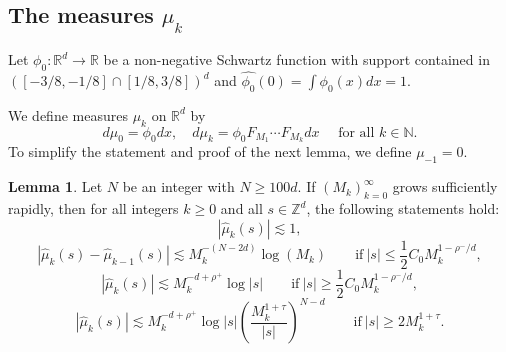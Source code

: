\documentclass{amsart}
\numberwithin{equation}{section}
\theoremstyle{definition}
\newtheorem{lemma}[theorem]{Lemma}
\theoremstyle{definition}
\def\RR{\mathbb{R}}
\def\ZZ{\mathbb{Z}}
\def\NN{\mathbb{N}}
\begin{document}
\subsection{The measures \texorpdfstring{$\mu_k$}{muk}}


Let $\phi_0:\RR^d \to \RR$ be a non-negative Schwartz function with support contained in  $([-3/8,-1/8] \cap [1/8,3/8])^d$ and $\widehat{\phi_0}(0) = \int \phi_0(x) dx = 1$. 
%


We define measures $\mu_k$ on $\RR^d$ by
$$
d\mu_0 = \phi_0 dx, \quad d\mu_k = \phi_0  F_{M_1} \cdots F_{M_{k}} dx \quad \text{ for all } k \in \NN.
$$
To simplify the statement and proof of the next lemma, we define $\mu_{-1}=0$. 



\begin{lemma}\label{mu_k_lemma}
Let $N$ be an integer with $N \geq 100 d$. 
If $(M_{k})_{k=0}^{\infty}$  grows sufficiently rapidly, then for all integers $k \geq 0$ and all $s \in \ZZ^d$, the following statements hold: 
\begin{equation}
\label{mu-1} |\widehat{\mu}_k(s) | \lesssim 1,   
\end{equation}
%
\begin{equation}
\label{mu-2} |\widehat{\mu}_k(s)  -\widehat{\mu}_{k-1}(s)| \lesssim 
M_k^{-(N-2d)}\log(M_k)  \qquad {\text{if}} \ |s| \leq 
% 
\frac{1}{2}C_0 M_k^{1-\rho^{-}/d}, 
\end{equation}
\begin{equation}
\label{mu-3'}
|\widehat{\mu}_k(s)| \lesssim 
%
M_k^{-d+\rho^+}
\log |s|  \qquad {\text{if}} \ |s| \geq 
% 
\dfrac{1}{2} C_0 M_k^{1-\rho^{-}/d}, 
\end{equation}
\begin{equation}
\label{mu-4'}
|\widehat{\mu}_k(s)| \lesssim  
%
M_k^{-d+\rho^+}  
\log |s| \left( \frac{M_k^{1+\tau}}{|s|} \right)^{N-d} \qquad {\text{if}} \ |s| \geq 2M_k^{1+\tau}.    
\end{equation}


\end{lemma}
\end{document}
